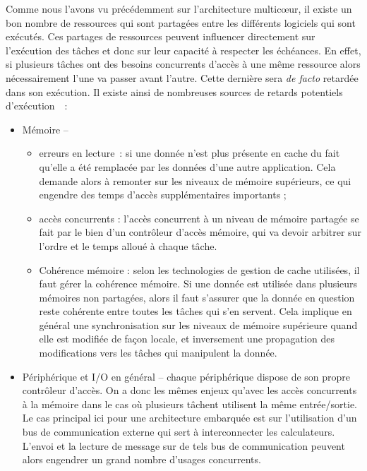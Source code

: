 \documentclass[french, a4paper, 11pt, twoside, pdftex]{StyleThese}
\begin{document}
	Comme nous l'avons vu précédemment sur l'architecture multicœur, il existe un bon nombre de ressources qui sont partagées entre les différents logiciels qui sont exécutés. Ces partages de ressources peuvent influencer directement sur l'exécution des tâches et donc sur leur capacité à respecter les échéances. En effet, si plusieurs tâches ont des besoins concurrents d'accès à une même ressource alors nécessairement l'une va passer avant l'autre. Cette dernière sera \textit{de facto} retardée dans son exécution. Il existe ainsi de nombreuses sources de retards potentiels d'exécution~\cite{kotaba_multicore_2013}~: 
	\begin{itemize}
		\item Mémoire --
		\begin{itemize}[label=$ \circ $] %
			\item 	erreurs en lecture~: si une donnée n'est plus présente en cache du fait qu'elle a été remplacée par les données d'une autre application. Cela demande alors à remonter sur les niveaux de mémoire supérieurs, ce qui engendre des temps d'accès supplémentaires importants ;
			\item 	accès concurrents : l'accès concurrent à un niveau de mémoire partagée se fait par le bien d'un contrôleur d'accès mémoire, qui va devoir arbitrer sur l'ordre et le temps alloué à chaque tâche.
			\item 	Cohérence mémoire : selon les technologies de gestion de cache utilisées, il faut gérer la cohérence mémoire. Si une donnée est utilisée dans plusieurs mémoires non partagées, alors il faut s'assurer que la donnée en question reste cohérente entre toutes les tâches qui s'en servent. Cela implique en général une synchronisation sur les niveaux de mémoire supérieure quand elle est modifiée de façon locale, et inversement une propagation des modifications vers les tâches qui manipulent la donnée.
		\end{itemize}
		\item Périphérique et I/O en général --
			chaque périphérique dispose de son propre contrôleur d'accès. On a donc les mêmes enjeux qu'avec les accès concurrents à la mémoire dans le cas où plusieurs tâchent utilisent la même entrée/sortie. Le cas principal ici pour une architecture embarquée est sur l'utilisation d'un bus de communication externe qui sert à interconnecter les calculateurs. L'envoi et la lecture de message sur de tels bus de communication peuvent alors engendrer un grand nombre d'usages concurrents. 

\end{itemize}
\end{document}
